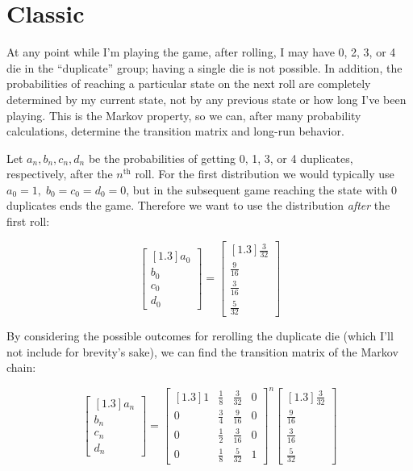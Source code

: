 \documentclass[11pt]{article} %
\begin{document}
\section{Classic}

At any point while I'm playing the game, after rolling, I may have 0, 2, 3, or 4 die in the ``duplicate'' group; having a single
die is not possible. In addition, the probabilities of reaching a particular state on the next roll are completely determined
by my current state, not by any previous state or how long I've been playing. This is the Markov property, so we can, after
many probability calculations, determine the transition matrix and long-run behavior.

Let $a_n, b_n, c_n, d_n$ be the probabilities of getting 0, 1, 3, or 4 duplicates, respectively, after the $n^{\text{th}}$ roll.
For the first distribution we would typically use $a_0 = 1, \; b_0 = c_0 = d_0 = 0$, but in the subsequent game reaching
the state with 0 duplicates ends the game. Therefore we want to use the distribution \emph{after} the first roll:

$$\begin{bmatrix}[1.3] a_0 \\ b_0 \\ c_0 \\ d_0 \end{bmatrix} = \begin{bmatrix}[1.3] \frac{3}{32} \\ \frac{9}{16} \\ \frac{3}{16} \\ \frac{5}{32} \end{bmatrix}$$

By considering the possible outcomes for rerolling the duplicate die (which I'll not include for brevity's sake), we can find the
transition matrix of the Markov chain:

$$\begin{bmatrix}[1.3] a_n \\ b_n \\ c_n \\ d_n \end{bmatrix} = \begin{bmatrix}[1.3] 1 & \frac{1}{8} & \frac{3}{32} & 0 \\ 0 & \frac{3}{4} & \frac{9}{16} & 0 \\ 0 & \frac{1}{2} & \frac{3}{16} & 0 \\ 0 & \frac{1}{8} & \frac{5}{32} & 1 \end{bmatrix}^n \begin{bmatrix}[1.3] \frac{3}{32} \\ \frac{9}{16} \\ \frac{3}{16} \\ \frac{5}{32} \end{bmatrix}$$
\end{document}
